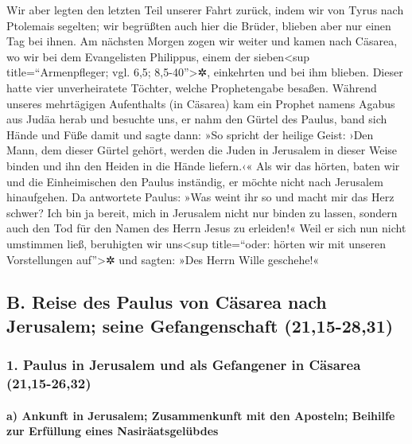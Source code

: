  Wir aber legten den letzten Teil unserer Fahrt zurück,
indem wir von Tyrus nach Ptolemais segelten; wir begrüßten auch hier die
Brüder, blieben aber nur einen Tag bei ihnen.  Am nächsten
Morgen zogen wir weiter und kamen nach Cäsarea, wo wir bei dem
Evangelisten Philippus, einem der sieben\textless sup
title=``Armenpfleger; vgl. 6,5; 8,5-40''\textgreater✲, einkehrten und
bei ihm blieben.  Dieser hatte vier unverheiratete
Töchter, welche Prophetengabe besaßen.  Während unseres
mehrtägigen Aufenthalts (in Cäsarea) kam ein Prophet namens Agabus aus
Judäa herab  und besuchte uns, er nahm den Gürtel des
Paulus, band sich Hände und Füße damit und sagte dann: »So spricht der
heilige Geist: ›Den Mann, dem dieser Gürtel gehört, werden die Juden in
Jerusalem in dieser Weise binden und ihn den Heiden in die Hände
liefern.‹«  Als wir das hörten, baten wir und die
Einheimischen den Paulus inständig, er möchte nicht nach Jerusalem
hinaufgehen.  Da antwortete Paulus: »Was weint ihr so und
macht mir das Herz schwer? Ich bin ja bereit, mich in Jerusalem nicht
nur binden zu lassen, sondern auch den Tod für den Namen des Herrn Jesus
zu erleiden!«  Weil er sich nun nicht umstimmen ließ,
beruhigten wir uns\textless sup title=``oder: hörten wir mit unseren
Vorstellungen auf''\textgreater✲ und sagten: »Des Herrn Wille geschehe!«

\hypertarget{b.-reise-des-paulus-von-cuxe4sarea-nach-jerusalem-seine-gefangenschaft-2115-2831}{%
\subsection{B. Reise des Paulus von Cäsarea nach Jerusalem; seine
Gefangenschaft
(21,15-28,31)}\label{b.-reise-des-paulus-von-cuxe4sarea-nach-jerusalem-seine-gefangenschaft-2115-2831}}

\hypertarget{paulus-in-jerusalem-und-als-gefangener-in-cuxe4sarea-2115-2632}{%
\subsubsection{1. Paulus in Jerusalem und als Gefangener in Cäsarea
(21,15-26,32)}\label{paulus-in-jerusalem-und-als-gefangener-in-cuxe4sarea-2115-2632}}

\hypertarget{a-ankunft-in-jerusalem-zusammenkunft-mit-den-aposteln-beihilfe-zur-erfuxfcllung-eines-nasiruxe4atsgeluxfcbdes}{%
\paragraph{a) Ankunft in Jerusalem; Zusammenkunft mit den Aposteln;
Beihilfe zur Erfüllung eines
Nasiräatsgelübdes}\label{a-ankunft-in-jerusalem-zusammenkunft-mit-den-aposteln-beihilfe-zur-erfuxfcllung-eines-nasiruxe4atsgeluxfcbdes}}

